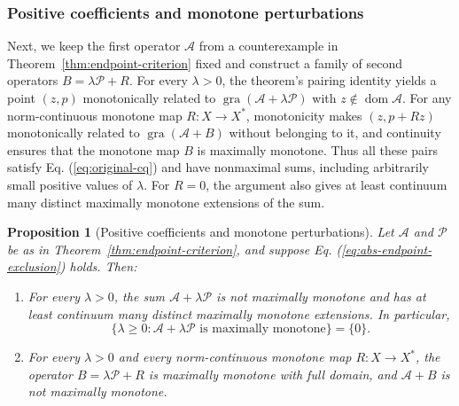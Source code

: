 \documentclass[11pt]{article}
\newcommand{\gra}{\operatorname{gra}}
\newcommand{\dom}{\operatorname{dom}}
\newtheorem{proposition}{Proposition}
\theoremstyle{definition}
\theoremstyle{remark}
\begin{document}
\subsubsection{Positive coefficients and monotone perturbations}
\label{subsec:main-positive-perturbations}
Next, we keep the first operator $\mathcal A$ from a counterexample in Theorem~\ref{thm:endpoint-criterion} fixed and construct a family of second operators $B=\lambda\mathcal P+R$. For every $\lambda>0$, the theorem's pairing identity yields a point $(z,p)$ monotonically related to $\gra(\mathcal A+\lambda\mathcal P)$ with $z\notin\dom\mathcal A$. For any norm-continuous monotone map $R:X\to X^*$, monotonicity makes $(z,p+Rz)$ monotonically related to $\gra(\mathcal A+B)$ without belonging to it, and continuity ensures that the monotone map $B$ is maximally monotone. Thus all these pairs satisfy Eq. (\ref{eq:original-cq}) and have nonmaximal sums, including arbitrarily small positive values of $\lambda$. For $R=0$, the argument also gives at least continuum many distinct maximally monotone extensions of the sum.
\begin{proposition}[Positive coefficients and monotone perturbations]
\label{cor:positive-perturbations}
Let $\mathcal A$ and $\mathcal P$ be as in Theorem~\ref{thm:endpoint-criterion}, and suppose Eq. (\ref{eq:abs-endpoint-exclusion}) holds. Then:
\begin{enumerate}
\item For every $\lambda>0$, the sum $\mathcal A+\lambda\mathcal P$ is not maximally monotone and has at least continuum many distinct maximally monotone extensions. In particular,
\[
\{\lambda\ge0:\mathcal A+\lambda\mathcal P\text{ is maximally monotone}\}=\{0\}.
\]
\item For every $\lambda>0$ and every norm-continuous monotone map $R:X\to X^*$, the operator $B=\lambda\mathcal P+R$ is maximally monotone with full domain, and $\mathcal A+B$ is not maximally monotone.
\end{enumerate}
\end{proposition}
\end{document}
